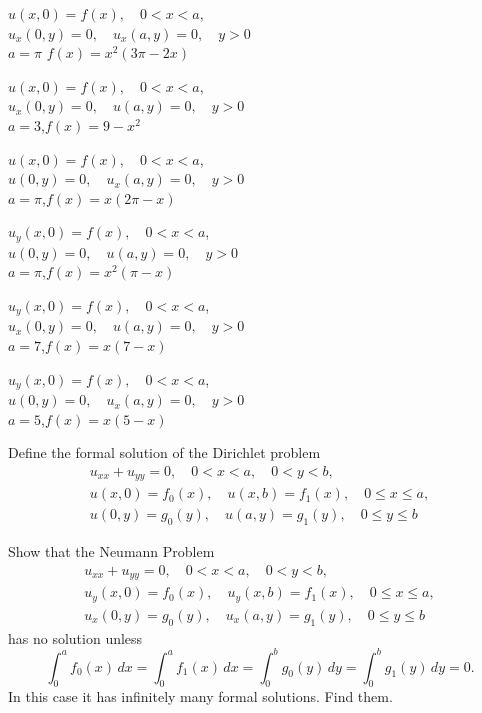 \begin{exerciselist}
\item\label{exer:12.3.29}$u(x,0)=f(x),\quad 0<x<a$,\quad\\
$u_x(0,y)=0,\quad u_x(a,y)=0,\quad y>0$  \\
$a=\pi$   $f(x)=x^2(3\pi-2x)$

\item\label{exer:12.3.30}$u(x,0)=f(x),\quad 0<x<a$,\\
$u_x(0,y)=0,\quad u(a,y)=0,\quad y>0$  \\
$a=3$,\quad $f(x)=9-x^2$

\item\label{exer:12.3.31}$u(x,0)=f(x),\quad 0<x<a$,\quad\\
$u(0,y)=0,\quad u_x(a,y)=0,\quad y>0$  \\
$a=\pi$,\quad $f(x)=x(2\pi-x)$

\item\label{exer:12.3.32}$u_y(x,0)=f(x),\quad 0<x<a$,\\
$u(0,y)=0,\quad u(a,y)=0,\quad y>0$  \\
$a=\pi$,\quad $f(x)=x^2(\pi-x)$

\item\label{exer:12.3.33}$u_y(x,0)=f(x),\quad 0<x<a$, \\
$u_x(0,y)=0,\quad u(a,y)=0,\quad y>0$  \\
$a=7$,\quad $f(x)=x(7-x)$

\item\label{exer:12.3.34}$u_y(x,0)=f(x),\quad 0<x<a$,\\
$u(0,y)=0,\quad u_x(a,y)=0,\quad y>0$  \\
$a=5$,\quad $f(x)=x(5-x)$

\item\label{exer:12.3.35}Define the formal solution of the Dirichlet problem
\begin{gather*}
u_{xx}+u_{yy}=0,\quad 0<x<a,\quad  0<y<b,\\
u(x,0)=f_0(x),\quad u(x,b)=f_1(x),\quad 0\le x\le a,\\
u(0,y)=g_0(y),\quad u(a,y)=g_1(y),\quad 0\le y\le b
\end{gather*}

\item\label{exer:12.3.36}Show that the  Neumann Problem
\begin{gather*}
u_{xx}+u_{yy}=0,\quad 0<x<a,\quad  0<y<b,\\
u_y(x,0)=f_0(x),\quad u_y(x,b)=f_1(x),\quad 0\le x\le a,\\
u_x(0,y)=g_0(y),\quad u_x(a,y)=g_1(y),\quad 0\le y\le b
\end{gather*}
has no solution unless
\[
\int_0^af_0(x)\,dx=
\int_0^af_1(x)\,dx=
\int_0^bg_0(y)\,dy=
\int_0^bg_1(y)\,dy=0.
\]
In this case it has infinitely many formal solutions.
Find  them.


\end{exerciselist}
